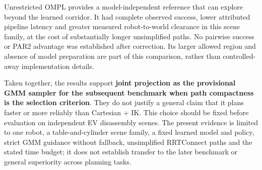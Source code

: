 Unrestricted OMPL provides a model-independent reference that can explore beyond the learned corridor. It had complete observed success, lower attributed pipeline latency and greater measured robot-to-world clearance in this scene family, at the cost of substantially longer unsimplified paths. No pairwise success or PAR2 advantage was established after correction. Its larger allowed region and absence of model preparation are part of this comparison, rather than controlled-away implementation details.

Taken together, the results support \textbf{joint projection as the provisional GMM sampler for the subsequent benchmark when path compactness is the selection criterion}. They do not justify a general claim that it plans faster or more reliably than Cartesian + IK. This choice should be fixed before evaluation on independent EV disassembly scenes. The present evidence is limited to one robot, a table-and-cylinder scene family, a fixed learned model and policy, strict GMM guidance without fallback, unsimplified RRTConnect paths and the stated time budget; it does not establish transfer to the later benchmark or general superiority across planning tasks.
